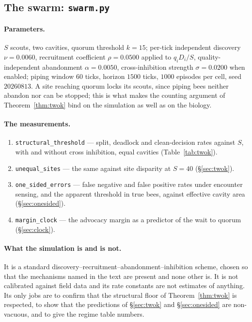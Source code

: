 \documentclass[11pt,a4paper]{article}
\theoremstyle{plain}
\theoremstyle{definition}
\theoremstyle{remark}
\begin{document}
\subsection*{The swarm: \texttt{swarm.py}}

\paragraph{Parameters.} $S$ scouts, two cavities, quorum threshold $k = 15$;
per-tick independent discovery $\nu = 0.0060$, recruitment coefficient
$\rho = 0.0500$ applied to $q_i D_i / S$, quality-independent abandonment
$\alpha = 0.0050$, cross-inhibition strength $\sigma = 0.0200$ when enabled;
piping window $60$ ticks, horizon $1500$ ticks, $1000$ episodes per cell, seed
$20260813$. A site reaching quorum locks its scouts, since piping bees neither
abandon nor can be stopped; this is what makes the counting argument of
Theorem~\ref{thm:twok} bind on the simulation as well as on the biology.

\paragraph{The measurements.}
\begin{enumerate}[leftmargin=1.6em]
\item \texttt{structural\_threshold} --- split, deadlock and clean-decision
      rates against $S$, with and without cross inhibition, equal cavities
      (Table~\ref{tab:twok}).
\item \texttt{unequal\_sites} --- the same against site disparity at $S = 40$
      (\S\ref{sec:twok}).
\item \texttt{one\_sided\_errors} --- false negative and false positive rates
      under encounter sensing, and the apparent threshold in true bees, against
      effective cavity area (\S\ref{sec:onesided}).
\item \texttt{margin\_clock} --- the advocacy margin as a predictor of the wait
      to quorum (\S\ref{sec:clock}).
\end{enumerate}

\paragraph{What the simulation is and is not.} It is a standard
discovery--recruitment--abandonment--inhibition scheme, chosen so that the
mechanisms named in the text are present and none other is. It is not
calibrated against field data and its rate constants are not estimates of
anything. Its only jobs are to confirm that the structural floor of
Theorem~\ref{thm:twok} is respected, to show that the predictions of
\S\ref{sec:twok} and \S\ref{sec:onesided} are non-vacuous, and to give the
regime table numbers.
\end{document}
